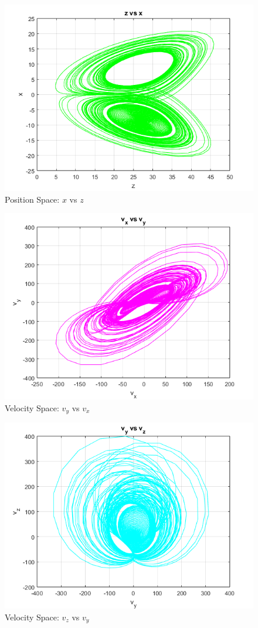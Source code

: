 \documentclass[%
reprint,
amsmath,amssymb,
aps,
floatfix,
]{revtex4-2}
\begin{document}
	\begin{figure}[htbp]
		\centering
		\includegraphics[width=0.8\linewidth]{x_vs_z.png}
		\caption{Position Space: $x$ vs $z$}
		\label{fig:x_z}
	\end{figure}
	
	\begin{figure}[htbp]
		\centering
		\includegraphics[width=0.8\linewidth]{vy_vs_vx.png}
		\caption{Velocity Space: $v_y$ vs $v_x$}
		\label{fig:vy_vx}
	\end{figure}
	
	\begin{figure}[htbp]
		\centering
		\includegraphics[width=0.8\linewidth]{vz_vs_vy.png}
		\caption{Velocity Space: $v_z$ vs $v_y$}
		\label{fig:vz_vy}
	\end{figure}
	
\end{document}
